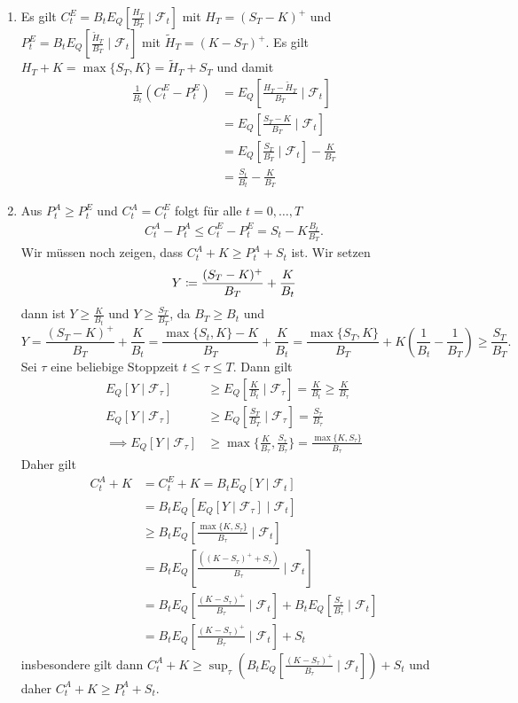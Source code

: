 \documentclass[a4paper,twoside,DIV15,BCOR12mm]{scrbook}
\newcommand{\cF}{\mathcal F}
\begin{document}
\begin{beweis}
\begin{enumerate}
\item Es gilt $C_t^E = B_t E_Q[\frac{H_T}{B_T}\mid \cF_t]$ mit $H_T = (S_T - K)^+$ und $P_t^E = B_tE_Q[\frac{\tilde H_T}{B_T} \mid \cF_t]$ mit $\tilde H_T = (K-S_T)^+$. Es gilt $H_T+K=\max\{S_T,K\} = \tilde H_T + S_T$ und damit
\begin{align*}
\frac 1 {B_t} (C_t^E - P_t^E) &= E_Q[\frac{H_T - \tilde H_T}{B_T}\mid \cF_t]\\
 & = E_Q[\frac{S_T - K}{B_T}\mid \cF_t] \\
&= E_Q[\frac{S_T}{B_T}\mid \cF_t] - \frac{K}{B_T} \\
&= \frac{S_t}{B_t} - \frac{K}{B_T}
\end{align*}
\item Aus $P_t^A \ge P_t^E$ und $C_t^A = C_t^E$ folgt für alle $t=0,\ldots,T$ 
\begin{align*}
C_t^A - P_t^A \le C_t^E - P_t^E = S_t - K\frac{B_t}{B_T}.
\end{align*}
Wir müssen noch zeigen, dass $C_t^A + K \ge P_t^A + S_t$ ist. Wir setzen 
\[
Y \da \frac{(S_T-K)^+}{B_T} + \frac K {B_t}
\]
dann ist $Y \ge \frac{K}{B_t}$ und $Y\ge \frac{S_T}{B_T}$, da  $B_T\ge B_t$ und
\[
Y = \frac{(S_T-K)^+}{B_T} + \frac K {B_t} = \frac{\max\{S_t,K\}-K}{B_T} + \frac K{B_t} = \frac{\max\{S_T,K\}}{B_T} + K(\frac{1}{B_t} - \frac 1 {B_T}) \ge \frac{S_T}{B_T}.
\]
Sei $\tau$ eine beliebige Stoppzeit $t\le \tau \le T$. Dann gilt
\begin{align*}
E_Q[Y\mid \cF_\tau] &\ge E_Q[\frac{K}{B_t} \mid \cF_\tau] = \frac{K}{B_t} \ge \frac{K}{B_\tau}\\
E_Q[Y\mid \cF_\tau] &\ge E_Q[\frac{S_T}{B_T} \mid \cF_\tau] = \frac{S_\tau}{B_\tau} \\
\implies E_Q[Y\mid \cF_\tau] & \ge \max\{\frac{K}{B_\tau}, \frac{S_\tau}{B_\tau}\} = \frac{\max\{K,S_\tau\}}{B_\tau}
\end{align*}
Daher gilt 
\begin{align*}
C_t^A + K &= C_t^E + K = B_t E_Q[Y\mid \cF_t]\\
&= B_t E_Q[ E_Q[Y\mid \cF_\tau ] \mid \cF_t] \\
&\ge B_t E_Q[ \frac{\max\{K,S_\tau\}}{B_\tau} \mid \cF_t] \\
&= B_t E_Q[\frac{( (K-S_\tau)^+ + S_\tau)}{B_\tau}  \mid \cF_t] \\
&= B_t E_Q[ \frac{(K-S_\tau)^+}{B_\tau} \mid \cF_t ] + B_t E_Q[\frac{S_\tau}{B_\tau}\mid \cF_t] \\
&= B_t E_Q[ \frac{(K-S_\tau)^+}{B_\tau} \mid \cF_t ] + S_t
\end{align*}
insbesondere gilt dann $C_t^A + K \ge \sup_{\tau} (B_t E_Q[\frac{(K-S_\tau)^+}{B_\tau}\mid \cF_t]) + S_t$ und daher $C_t^A + K \ge P_t^A + S_t$.
\end{enumerate}
\end{beweis}
\end{document}
